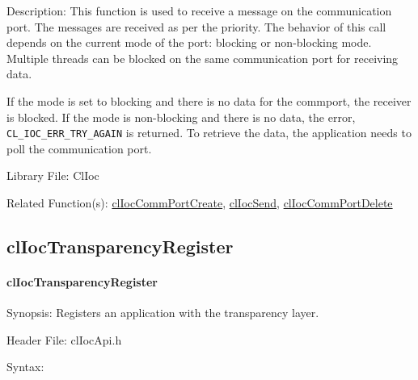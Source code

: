 \begin{flushleft}
\begin{Desc}
\begin{description}
\end{description}
\end{Desc}
\begin{Desc}
\item[Description:]This function is used to receive a message on the communication port. The messages are received as per the priority. The behavior of 
this call depends on the current mode of the port: blocking or non-blocking mode. Multiple threads can be blocked on the same communication port for 
receiving data. 
 \par
 If the mode is set to blocking and there is no data for the commport, the receiver is blocked. If the mode is non-blocking and there is no data, the 
 error, {\tt{CL\_\-IOC\_\-ERR\_\-TRY\_\-AGAIN}} is returned. To retrieve the data, the application needs to poll the communication port.
 \end{Desc}
\begin{Desc}
\item[Library File:]Cl\-Ioc\end{Desc}
\begin{Desc}
\item[Related Function(s):]\hyperlink{pageioc101}{cl\-Ioc\-Comm\-Port\-Create}, \hyperlink{pageioc104}{cl\-Ioc\-Send}, 
\hyperlink{pageioc103}{cl\-Ioc\-Comm\-Port\-Delete} \end{Desc}
\newpage


\subsection{clIocTransparencyRegister}
\hypertarget{pageioc118}{}\paragraph{cl\-Ioc\-Transparency\-Register}\label{pageioc118}
\begin{Desc}
\item[Synopsis:]Registers an application with the transparency layer.\end{Desc}
\begin{Desc}
\item[Header File:]clIocApi.h\end{Desc}
\begin{Desc}
\item[Syntax:]


\end{Desc}
\end{flushleft}
